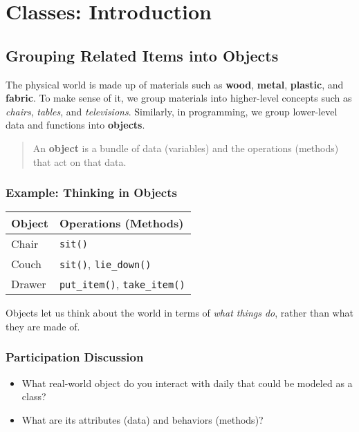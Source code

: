 \chapter{Classes: Introduction}

\section{Grouping Related Items into Objects}

The physical world is made up of materials such as \textbf{wood}, \textbf{metal}, \textbf{plastic}, and \textbf{fabric}.
To make sense of it, we group materials into higher-level concepts such as \textit{chairs}, \textit{tables}, and \textit{televisions}.
Similarly, in programming, we group lower-level data and functions into \textbf{objects}.

\begin{quote}
An \textbf{object} is a bundle of data (variables) and the operations (methods) that act on that data.
\end{quote}

\subsection*{Example: Thinking in Objects}

\begin{center}
\begin{tabular}{|l|l|}
\hline
\textbf{Object} & \textbf{Operations (Methods)} \\
\hline
Chair & \texttt{sit()} \\
Couch & \texttt{sit()}, \texttt{lie\_down()} \\
Drawer & \texttt{put\_item()}, \texttt{take\_item()} \\
\hline
\end{tabular}
\end{center}

Objects let us think about the world in terms of \emph{what things do}, rather than what they are made of.

\subsection*{Participation Discussion}
\begin{itemize}
  \item What real-world object do you interact with daily that could be modeled as a class?
  \item What are its attributes (data) and behaviors (methods)?
\end{itemize}

